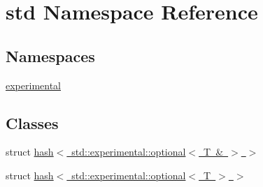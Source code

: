 \hypertarget{namespacestd}{}\section{std Namespace Reference}
\label{namespacestd}
\subsection*{Namespaces}
\begin{DoxyCompactItemize}
\item 
 \mbox{\hyperlink{namespacestd_1_1experimental}{experimental}}
\end{DoxyCompactItemize}
\subsection*{Classes}
\begin{DoxyCompactItemize}
\item 
struct \mbox{\hyperlink{structstd_1_1hash_3_01std_1_1experimental_1_1optional_3_01_t_01_6_01_4_01_4}{hash$<$ std\+::experimental\+::optional$<$ T \& $>$ $>$}}
\item 
struct \mbox{\hyperlink{structstd_1_1hash_3_01std_1_1experimental_1_1optional_3_01_t_01_4_01_4}{hash$<$ std\+::experimental\+::optional$<$ T $>$ $>$}}
\end{DoxyCompactItemize}
